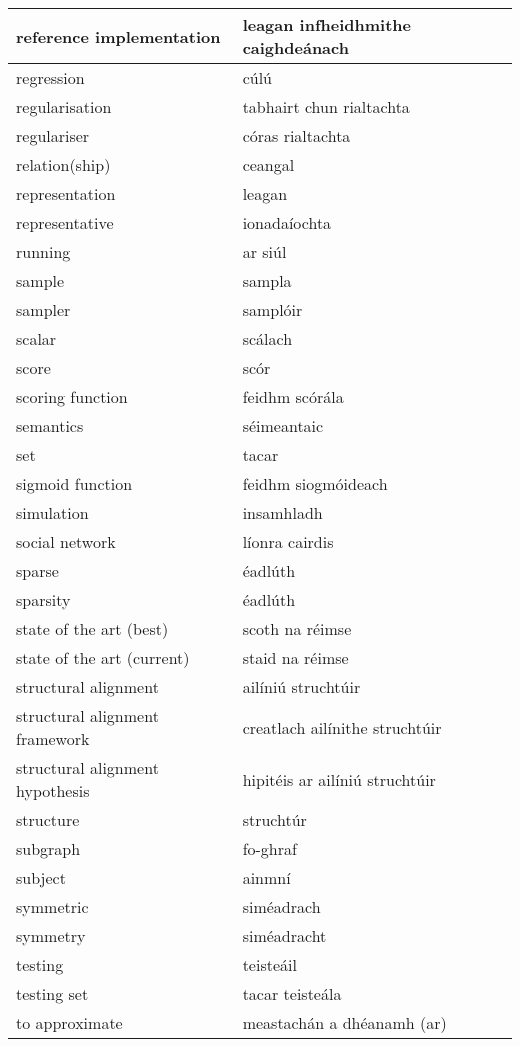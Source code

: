 \documentclass{article}
\begin{document}
\begin{longtable}{|l|l|}
		reference implementation&leagan infheidhmithe caighdeánach\\ \hline 
		regression&cúlú\\ \hline 
		regularisation&tabhairt chun rialtachta\\ \hline 
		regulariser&córas rialtachta\\ \hline 
		relation(ship)&ceangal\\ \hline 
		representation&leagan\\ \hline 
		representative&ionadaíochta\\ \hline 
		running&ar siúl\\ \hline 
		sample&sampla\\ \hline 
		sampler&samplóir\\ \hline 
		scalar&scálach\\ \hline 
		score&scór\\ \hline 
		scoring function&feidhm scórála\\ \hline 
		semantics&séimeantaic\\ \hline 
		set&tacar\\ \hline 
		sigmoid function&feidhm siogmóideach\\ \hline 
		simulation&insamhladh\\ \hline 
		social network&líonra cairdis\\ \hline 
		sparse&éadlúth\\ \hline 
		sparsity&éadlúth\\ \hline 
		state of the art (best)&scoth na réimse\\ \hline 
		state of the art (current)&staid na réimse\\ \hline 
		structural alignment&ailíniú struchtúir\\ \hline 
		structural alignment framework&creatlach ailínithe struchtúir\\ \hline 
		structural alignment hypothesis&hipitéis ar ailíniú struchtúir\\ \hline 
		structure&struchtúr\\ \hline 
		subgraph&fo-ghraf\\ \hline 
		subject&ainmní\\ \hline 
		symmetric&siméadrach\\ \hline 
		symmetry&siméadracht\\ \hline 
		testing&teisteáil\\ \hline 
		testing set&tacar teisteála\\ \hline 
		to approximate&meastachán a dhéanamh (ar)\\ \hline 

\end{longtable}
\end{document}
